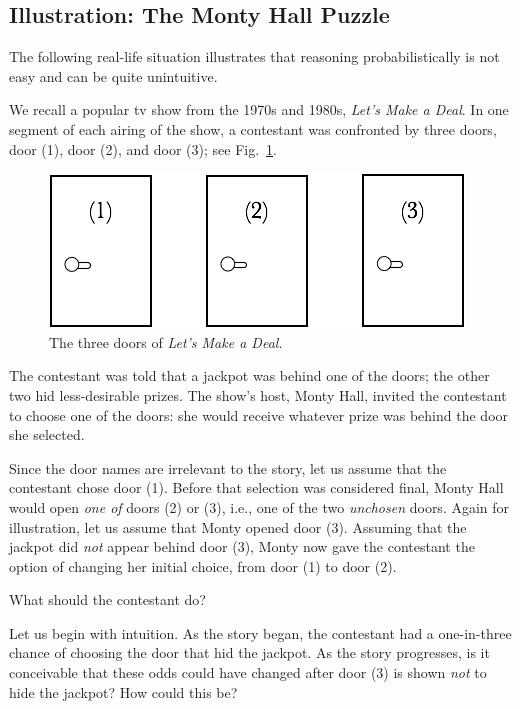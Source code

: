 \subsection{Illustration: The Monty Hall Puzzle}
\label{sec:monty-hall}

The following real-life situation illustrates that reasoning
probabilistically is not easy and can be quite unintuitive.

We recall a popular tv show from the 1970s and 1980s, \textit{Let's
  Make a Deal}. In one segment of each airing of the show, a
contestant was confronted by three doors, door (1), door (2), and door
(3); see Fig.~\ref{fig:MonthyHal-1}.
\begin{figure}[htb]
\begin{center}
        \includegraphics[scale=0.4]{FiguresMaths/MonthyHallInitial}
        \caption{The three doors of \textit{Let's Make a Deal}.}
        \label{fig:MonthyHal-1}
\end{center}
\end{figure}
The contestant was told that a jackpot was behind one of the doors;
the other two hid less-desirable prizes.  The show's host, Monty Hall,
 invited the contestant to choose one of the doors:
she would receive whatever prize was behind the door she selected.

Since the door names are irrelevant to the story, let us assume that
the contestant chose door (1).  Before that selection was considered
final, Monty Hall would open {\em one of} doors (2) or (3), i.e., one
of the two {\em unchosen} doors.  Again for illustration, let us
assume that Monty opened door (3).  Assuming that the jackpot did {\em
  not} appear behind door (3), Monty now gave the contestant the
option of changing her initial choice, from door (1) to door (2).

What should the contestant do?  

Let us begin with intuition.  As the story began, the contestant had a
one-in-three chance of choosing the door that hid the jackpot.  As the
story progresses, is it conceivable that these odds could have changed after door
(3) is shown {\em not} to hide the jackpot?  How could this be?

